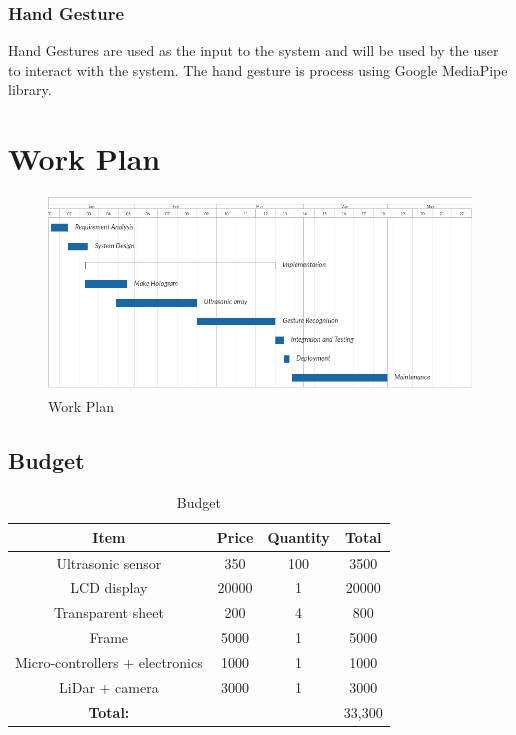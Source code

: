 \documentclass{fisatproject}
\begin{document}
\subsection{Hand Gesture}
Hand Gestures are used as the input to the system and will be used by the user to interact with the system.
The hand gesture is process using Google  MediaPipe library.

\chapter{Work Plan}
\enlargethispage{1em}
    \begin{figure}[h!]
        \includegraphics[scale=.5]{images/work_plan.png}
        \caption{Work Plan}
        \end{figure}
 \section{Budget}
    \renewcommand{\arraystretch}{1.3}
    \begin{center}
        \begin{table}[h]
            \begin{tabular}{ |c|c|c|c| }
                \hline
                Item & Price & Quantity & Total \\
                \hline
                Ultrasonic sensor & 350  & 100 & 3500 \\
                LCD display & 20000 & 1 & 20000 \\
                Transparent sheet & 200 & 4 & 800 \\
                Frame & 5000 & 1 & 5000 \\
                Micro-controllers + electronics & 1000 & 1 & 1000 \\
                LiDar + camera & 3000 & 1 & 3000 \\
                \hline
                \hline
                \textbf{Total:} &  & & 33,300\\
                \hline
                \end{tabular}
                \caption{Budget}
        \end{table}   
    \end{center}
\end{document}
